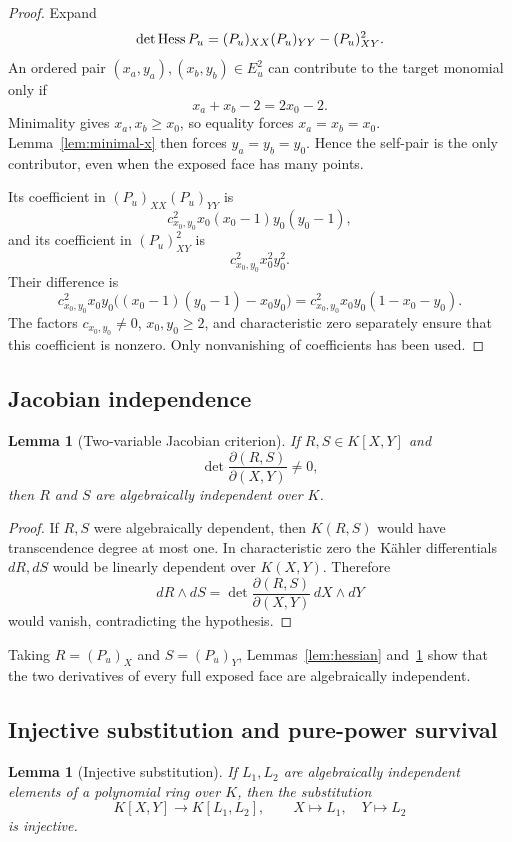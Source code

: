 \documentclass[11pt]{article}
\newtheorem{lemma}[theorem]{Lemma}
\theoremstyle{definition}
\theoremstyle{remark}
\begin{document}
\begin{proof}
Expand
\[
\det\operatorname{Hess} P_u=(P_u)_{XX}(P_u)_{YY}-(P_u)_{XY}^2.
\]
An ordered pair \((x_a,y_a),(x_b,y_b)\in E_u^2\) can contribute to the
target monomial only if
\[
x_a+x_b-2=2x_0-2.
\]
Minimality gives \(x_a,x_b\geq x_0\), so equality forces
\(x_a=x_b=x_0\).  Lemma~\ref{lem:minimal-x} then forces
\(y_a=y_b=y_0\).  Hence the self-pair is the only contributor, even when
the exposed face has many points.

Its coefficient in \((P_u)_{XX}(P_u)_{YY}\) is
\[
c_{x_0,y_0}^2x_0(x_0-1)y_0(y_0-1),
\]
and its coefficient in \((P_u)_{XY}^2\) is
\[
c_{x_0,y_0}^2x_0^2y_0^2.
\]
Their difference is
\[
c_{x_0,y_0}^2x_0y_0
\bigl((x_0-1)(y_0-1)-x_0y_0\bigr)
=c_{x_0,y_0}^2x_0y_0(1-x_0-y_0).
\]
The factors \(c_{x_0,y_0}\neq0\), \(x_0,y_0\geq2\), and characteristic
zero separately ensure that this coefficient is nonzero.  Only
nonvanishing of coefficients has been used.
\end{proof}

\subsection{Jacobian independence}

\begin{lemma}[Two-variable Jacobian criterion]\label{lem:jacobian}
If \(R,S\in K[X,Y]\) and
\[
\det\frac{\partial(R,S)}{\partial(X,Y)}\neq0,
\]
then \(R\) and \(S\) are algebraically independent over \(K\).
\end{lemma}

\begin{proof}
If \(R,S\) were algebraically dependent, then \(K(R,S)\) would have
transcendence degree at most one.  In characteristic zero the Kähler
differentials \(dR,dS\) would be linearly dependent over \(K(X,Y)\).
Therefore
\[
dR\wedge dS
=\det\frac{\partial(R,S)}{\partial(X,Y)}\,dX\wedge dY
\]
would vanish, contradicting the hypothesis.
\end{proof}

Taking \(R=(P_u)_X\) and \(S=(P_u)_Y\), Lemmas~\ref{lem:hessian}
and~\ref{lem:jacobian} show that the two derivatives of every full exposed
face are algebraically independent.

\subsection{Injective substitution and pure-power survival}

\begin{lemma}[Injective substitution]\label{lem:substitution}
If \(L_1,L_2\) are algebraically independent elements of a polynomial
ring over \(K\), then the substitution
\[
K[X,Y]\longrightarrow K[L_1,L_2],\qquad X\longmapsto L_1,\quad
Y\longmapsto L_2
\]
is injective.
\end{lemma}
\end{document}
